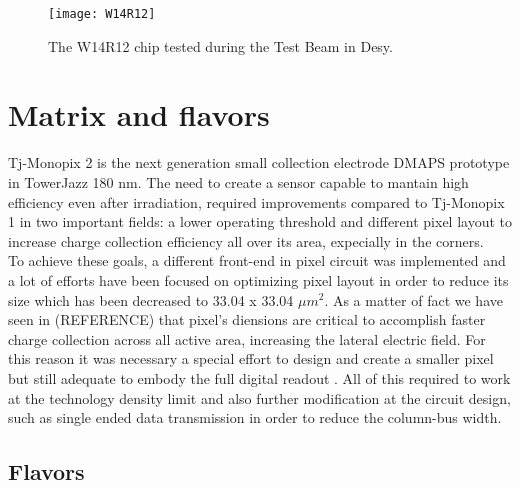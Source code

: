 \begin{figure}[h!]
\centering
\texttt{[image: W14R12]}
\caption{The W14R12 chip tested during the Test Beam in Desy.}
\label{fig:w14r12}
\end{figure}




\section{Matrix and flavors}


Tj-Monopix 2 is the next generation small collection electrode DMAPS prototype in TowerJazz 180 nm. The need to create a sensor capable to mantain high efficiency even after irradiation, required improvements compared to Tj-Monopix 1 in two important fields: a lower operating threshold and different pixel layout to increase charge collection efficiency all over its area, expecially in the corners.\\

To achieve these goals, a different front-end in pixel circuit was implemented and a lot of efforts have been focused on optimizing pixel layout in order to reduce its size which has been decreased to 33.04 x 33.04 $\mu m^{2}$. As a matter of fact we have seen in (REFERENCE) that pixel's diensions are critical to accomplish faster charge collection across all active area, increasing the lateral electric field. For this reason it was necessary a special effort to design and create a smaller pixel but still adequate to embody the full digital readout . All of this required to work at the technology density limit and also further modification at the circuit design, such as single ended data transmission in order to reduce the column-bus width.




\subsection{Flavors}

